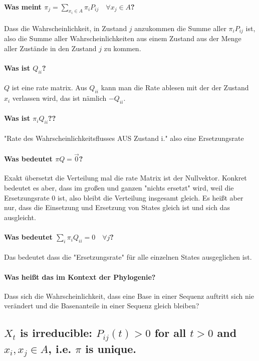 \paragraph{Was meint $\pi_j = \sum_{x_i\in A} \pi_i P_{ij} \quad \forall x_j \in A$?}
Dass die Wahrscheinlichkeit, in Zustand $j$ anzukommen die Summe aller $\pi_i P_{ij}$ ist, also die Summe aller Wahrscheinlichkeiten aus einem Zustand aus der Menge aller Zustände in den Zustand $j$ zu kommen.


\paragraph{Was ist $Q_{ii}$?}
$Q$ ist eine rate matrix. Aus $Q_{ii}$ kann man die Rate ablesen mit der der Zustand $x_i$ verlassen wird, das ist nämlich $-Q_{ii}$.

\paragraph{Was ist $\pi_i Q_{ii}$??}
"Rate des Wahrscheinlichkeitsflusses AUS Zustand i." also eine Ersetzungsrate

\paragraph{Was bedeutet $\pi Q = \overrightarrow{0}$?}
Exakt übersetzt die Verteilung mal die rate Matrix ist der Nullvektor. Konkret bedeutet es aber, dass im großen und ganzen "nichts ersetzt" wird, weil die Ersetzungsrate 0 ist, also bleibt die Verteilung insgesamt gleich. Es heißt aber nur, dass die Einsetzung und Ersetzung von States gleich ist und sich das ausgleicht. 

\paragraph{Was bedeutet $\sum_i \pi_i Q_{ii} = 0 \quad \forall j$?}
Das bedeutet dass die "Ersetzungsrate" für alle einzelnen States ausgeglichen ist. 

\paragraph{Was heißt das im Kontext der Phylogenie?}
Dass sich die Wahrscheinlichkeit, dass eine Base in einer Sequenz auftritt sich nie verändert und die Basenanteile in einer Sequenz gleich bleiben?

\subsection{$X_t$ is irreducible: $P_{ij} (t) > 0$ for all $t > 0$ and $x_i , x_j \in A$, i.e. $\pi$ is unique.}
